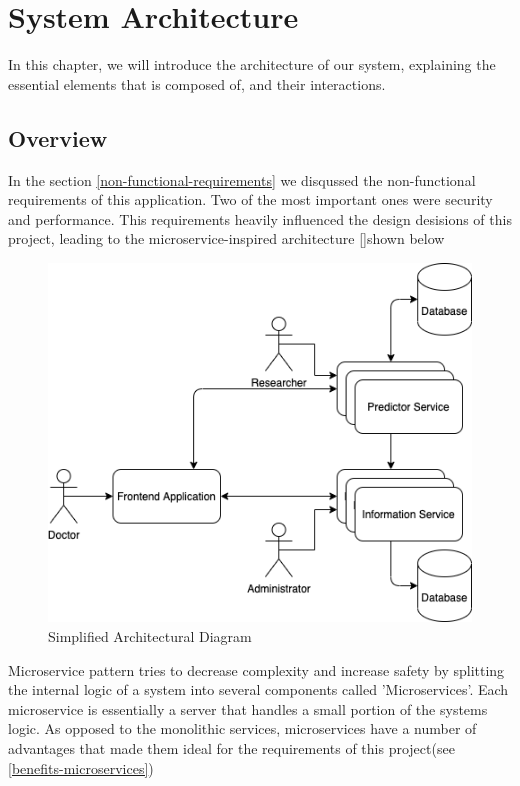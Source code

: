 \chapter{System Architecture}
	\label{4}
	In this chapter, we will introduce the architecture of our system, explaining the essential elements
	that is composed of, and their interactions.
	\section{Overview}
		In the section \ref{non-functional-requirements} we disqussed the non-functional requirements of this application. Two of the most
		important ones were security and performance. This requirements heavily influenced the design desisions of this project, leading
		to the microservice-inspired architecture [\cite{newman_2020}]shown below
		
		\begin{figure}[H]
			\iftrue
			\caption{Simplified Architectural Diagram}
			\centering
			\includegraphics[scale=0.5]{figures/system-architecture}
			\fi
		\end{figure}
		Microservice pattern tries to decrease complexity and increase safety by splitting the internal logic of a system into several components called
		'Microservices'. Each microservice is essentially a server that handles a small portion of the systems logic. As opposed to the 
		monolithic services, microservices have a number of advantages that made them ideal for the requirements of this project(see \ref{benefits-microservices})
				
